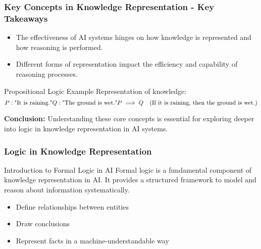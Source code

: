 \documentclass[aspectratio=169]{beamer}
\begin{document}
\begin{frame}[fragile]
    \frametitle{Key Concepts in Knowledge Representation - Key Takeaways}
    \begin{itemize}
        \item The effectiveness of AI systems hinges on how knowledge is represented and how reasoning is performed.
        \item Different forms of representation impact the efficiency and capability of reasoning processes.
    \end{itemize}
    
    \begin{block}{Propositional Logic Example}
        Representation of knowledge:
        \begin{equation}
            P: \text{"It is raining."} \\
            Q: \text{"The ground is wet."} \\
            P \implies Q \quad (\text{If it is raining, then the ground is wet.})
        \end{equation}
    \end{block}
    
    \textbf{Conclusion:} Understanding these core concepts is essential for exploring deeper into logic in knowledge representation in AI systems.
\end{frame}

\begin{frame}[fragile]
    \frametitle{Logic in Knowledge Representation}
    \begin{block}{Introduction to Formal Logic in AI}
        Formal logic is a fundamental component of knowledge representation in AI. It provides a structured framework to model and reason about information systematically. 
        \begin{itemize}
            \item Define relationships between entities
            \item Draw conclusions
            \item Represent facts in a machine-understandable way
        \end{itemize}
    \end{block}
\end{frame}
\end{document}
